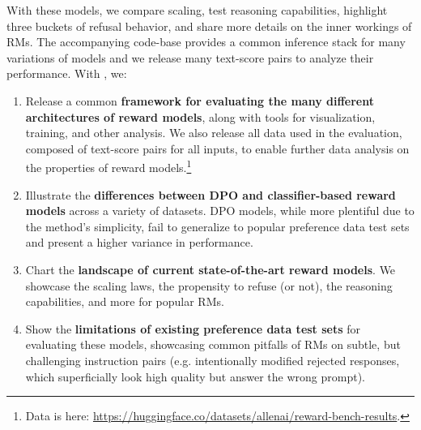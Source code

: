 With these models, we compare scaling, test reasoning capabilities, highlight three buckets of refusal behavior, and share more details on the inner workings of RMs.
The accompanying code-base %
provides a common inference stack for many variations of models and we release many text-score pairs to analyze their performance.
With \textbf{\name}, we:
\begin{enumerate}[leftmargin=0.5cm]
    \item Release a common \textbf{framework for evaluating the many different architectures of reward models}, along with tools for visualization, training, and other analysis.
    We also release all data used in the evaluation, composed of text-score pairs for all inputs, to enable further data analysis on the properties of reward models.\footnote{Data is here: \url{https://huggingface.co/datasets/allenai/reward-bench-results}.}
    \item Illustrate the \textbf{differences between DPO and classifier-based reward models} across a variety of datasets. 
    DPO models, while more plentiful due to the method's simplicity, fail to generalize to popular preference data test sets and present a higher variance in performance.
    \item Chart the \textbf{landscape of current state-of-the-art reward models}. 
    We showcase the scaling laws, the propensity to refuse (or not), the reasoning capabilities, and more for popular RMs.
    \item Show the \textbf{limitations of existing preference data test sets} for evaluating these models, showcasing common pitfalls of RMs on subtle, but challenging instruction pairs (e.g. intentionally modified rejected responses, which superficially look high quality but answer the wrong prompt).
\end{enumerate}

